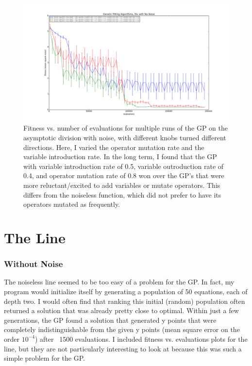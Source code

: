 \documentclass[11pt,amsmath,amssymb]{revtex4}
\begin{document}
\begin{figure}[H]
\center
\includegraphics[scale=0.4]{Div_Noise_Comparison.png}
\caption{Fitness vs. number of evaluations for multiple runs of the GP on the asymptotic division with noise, with different knobs turned different directions. Here, I varied the operator mutation rate and the variable introduction rate. In the long term, I found that the GP with variable introduction rate of 0.5, variable outroduction rate of 0.4, and operator mutation rate of 0.8 won over the GP's that were more reluctant/excited to add variables or mutate operators. This differs from the noiseless function, which did not prefer to have its operators mutated as frequently.}
\label{q1}
\end{figure}


\section{The Line}
\subsubsection{Without Noise}
The noiseless line seemed to be too easy of a problem for the GP. In fact, my program would initialize itself by generating a population of 50 equations, each of depth two. I would often find that ranking this initial (random) population often returned a solution that was already pretty close to optimal. Within just a few generations, the GP found a solution that generated y points that were completely indistinguishable from the given y points (mean square error on the order $10^{-4}$) after ~1500 evaluations. I included fitness vs. evaluations plots for the line, but they are not particularly interesting to look at because this was such a simple problem for the GP.
\end{document}
